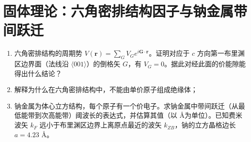 \section{固体理论：六角密排结构因子与钠金属带间跃迁}
\label{sec:hcp-structure-factor}

\begin{modelbox}
\begin{enumerate}
    \item 六角密排结构的周期势 $V(\bm{r})=\sum_G V_G e^{i\bm{G}\cdot\bm{r}}$。证明对应于 $c$ 方向第一布里渊区边界面（法线沿 $\langle001\rangle$）的倒格矢 $G$，有 $V_G=0$。据此对经此面的价能隙能得出什么结论？
    \item 解释为什么在六角密排结构中，不能由单价原子组成绝缘体；
    \item 钠金属为体心立方结构，每个原子有一个价电子。求钠金属中带间跃迁（从最低能带到次高能带）阈波长的表达式，并估算其值（以 \AA 为单位）。已知费米波矢 $k_F$ 远小于布里渊区边界上离原点最近的波矢 $k_{ZB}$，钠的立方晶格边长 $a=4.23$ \AA。
\end{enumerate}
\end{modelbox}

\begin{tipbox}[考点快速分析]
\begin{itemize}
    \item \textbf{结构因子}：$S(\bm{G})=\sum_j e^{i\bm{G}\cdot\bm{d}_j}$，若 $S(G)=0$ 则 $V_G=0$
    \item \textbf{HCP基矢}：原胞含2个原子，$\bm{d}_A=0$，$\bm{d}_B=\frac{a}{2}\hat{\bm{i}}+\frac{\sqrt{3}a}{6}\hat{\bm{j}}+\frac{c}{2}\hat{\bm{k}}}$
    \item \textbf{能隙为零}：能带在布里渊区边界接触，系统呈金属性
    \item \textbf{带间跃迁}：$\hbar\omega_{\text{th}}=E(2k_{ZB}-k_F)-E(k_F)$
\end{itemize}
\end{tipbox}

